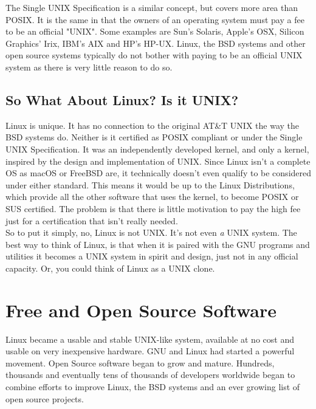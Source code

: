 The Single UNIX Specification is a similar concept, but covers more area than POSIX.  It is the same in that the owners of an operating system must pay a fee to be an official "UNIX".  Some examples are Sun's Solaris, Apple's OSX, Silicon Graphics' Irix, IBM's AIX and HP's HP-UX.  Linux, the BSD systems and other open source systems typically do not bother with paying to be an official UNIX system as there is very little reason to do so.\\

\subsection{So What About Linux? Is it UNIX?}

Linux is unique.  It has no connection to the original AT\&T UNIX the way the BSD systems do.  Neither is it certified as POSIX compliant or under the Single UNIX Specification.  It was an independently developed kernel, and only a kernel, inspired by the design and implementation of UNIX.  Since Linux isn't a complete OS as macOS or FreeBSD are, it technically doesn't even qualify to be considered under either standard.  This means it would be up to the Linux Distributions, which provide all the other software that uses the kernel, to become POSIX or SUS certified.  The problem is that there is little motivation to pay the high fee just for a certification that isn't really needed.\\

So to put it simply, no, Linux is not UNIX.  It's not even \textit{a} UNIX system.  The best way to think of Linux, is that when it is paired with the GNU programs and utilities it becomes a UNIX system in spirit and design, just not in any official capacity.  Or, you could think of Linux as a UNIX clone.

\section{Free and Open Source Software}

Linux became a usable and stable UNIX-like system, available at no cost and usable on very inexpensive hardware. GNU and Linux had started a powerful movement.  Open Source software began to grow and mature.  Hundreds, thousands and eventually tens of thousands of developers worldwide began to combine efforts to improve Linux, the BSD systems and an ever growing list of open source projects.\\

